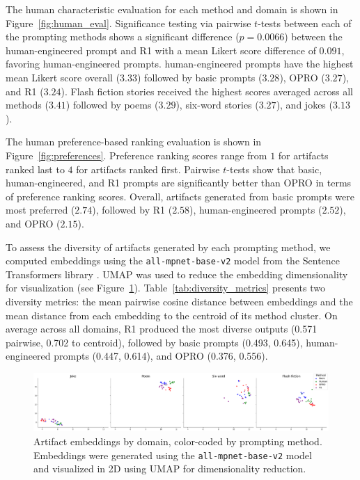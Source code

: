 \documentclass[phd,electronic,oneside,twosidetoc,letterpaper,chaptercenter,parttop,lof]{byumsphd}
\begin{document}
The human characteristic evaluation for each method and domain is shown in Figure~\ref{fig:human_eval}. Significance testing via pairwise $t$-tests between each of the prompting methods shows a significant difference ($p=0.0066$) between the human-engineered prompt and R1 with a mean Likert score difference of $0.091$, favoring human-engineered prompts.  human-engineered prompts have the highest mean Likert score overall ($3.33$) followed by basic prompts ($3.28$), OPRO ($3.27$), and R1 ($3.24$). Flash fiction stories received the highest scores averaged across all methods ($3.41$) followed by poems ($3.29$), six-word stories ($3.27$), and jokes ($3.13$). 

The human preference-based ranking evaluation is shown in Figure~\ref{fig:preferences}. Preference ranking scores range from $1$ for artifacts ranked last to $4$ for artifacts ranked first. Pairwise $t$-tests show that basic, human-engineered, and R1 prompts are significantly better than OPRO in terms of preference ranking scores. Overall, artifacts generated from basic prompts were most preferred ($2.74$), followed by R1 ($2.58$), human-engineered prompts ($2.52$), and OPRO ($2.15$). 

To assess the diversity of artifacts generated by each prompting method, we computed embeddings using the \texttt{all-mpnet-base-v2} model from the Sentence Transformers library \cite{reimers-2019-sentence-bert}. UMAP \cite{mcinnes2020umap} was used to reduce the embedding dimensionality for visualization (see Figure~\ref{fig:embeds}). Table~\ref{tab:diversity_metrics} presents two diversity metrics: the mean pairwise cosine distance between embeddings and the mean distance from each embedding to the centroid of its method cluster. On average across all domains, R1 produced the most diverse outputs (0.571 pairwise, 0.702 to centroid), followed by basic prompts (0.493, 0.645), human-engineered prompts (0.447, 0.614), and OPRO (0.376, 0.556).

\begin{figure}
    \centering
    \includegraphics[width=\textwidth]{images/cc_prompting/umap_embeddings.png}
    \caption[Artifact embeddings]{Artifact embeddings by domain, color-coded by prompting method. Embeddings were generated using the \texttt{all-mpnet-base-v2} model and visualized in 2D using UMAP for dimensionality reduction.}
    \label{fig:embeds}
\end{figure}
\end{document}
